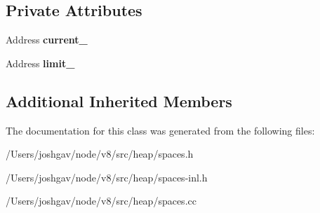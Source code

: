 \subsection*{Private Attributes}
\begin{DoxyCompactItemize}
\item 
Address {\bfseries current\+\_\+}\hypertarget{classv8_1_1internal_1_1_semi_space_iterator_abf0e407d66836b360df719073fdb4b7d}{}\label{classv8_1_1internal_1_1_semi_space_iterator_abf0e407d66836b360df719073fdb4b7d}

\item 
Address {\bfseries limit\+\_\+}\hypertarget{classv8_1_1internal_1_1_semi_space_iterator_a7c3c3c6f15877909f8e42c56a7282068}{}\label{classv8_1_1internal_1_1_semi_space_iterator_a7c3c3c6f15877909f8e42c56a7282068}

\end{DoxyCompactItemize}
\subsection*{Additional Inherited Members}


The documentation for this class was generated from the following files\+:\begin{DoxyCompactItemize}
\item 
/\+Users/joshgav/node/v8/src/heap/spaces.\+h\item 
/\+Users/joshgav/node/v8/src/heap/spaces-\/inl.\+h\item 
/\+Users/joshgav/node/v8/src/heap/spaces.\+cc\end{DoxyCompactItemize}
